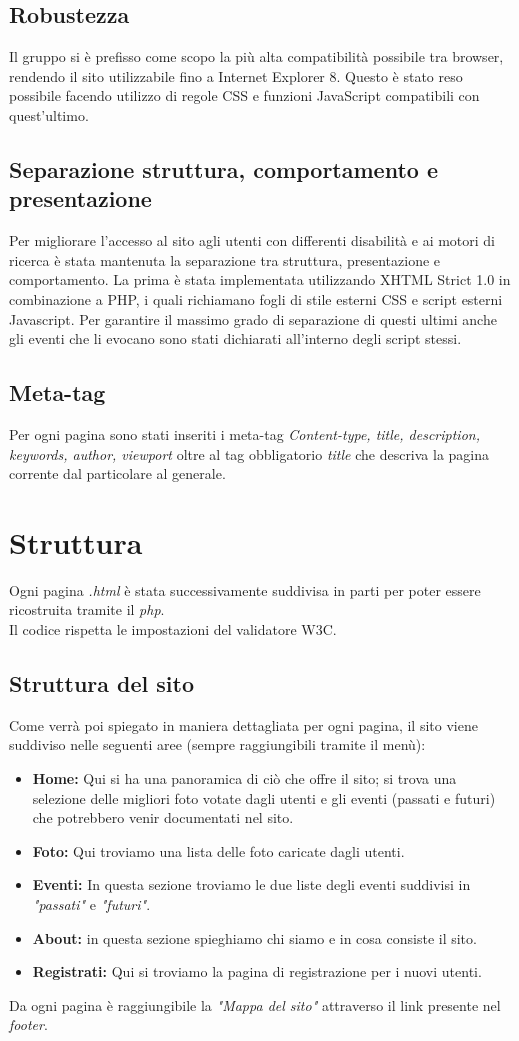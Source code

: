 	\subsection{Robustezza}
	Il gruppo si è prefisso come scopo la più alta compatibilità possibile tra browser, rendendo il sito utilizzabile fino a Internet Explorer 8. Questo è stato reso possibile facendo utilizzo di regole CSS e funzioni JavaScript compatibili con quest'ultimo.
	\subsection{Separazione struttura, comportamento e presentazione}
	Per migliorare l’accesso al sito agli utenti con differenti disabilità e ai motori di
ricerca è stata mantenuta la separazione tra struttura, presentazione e comportamento.
La prima è stata implementata utilizzando XHTML Strict 1.0 in combinazione a PHP, i quali richiamano fogli di stile esterni CSS e script esterni Javascript. Per garantire il massimo grado di separazione di questi ultimi anche gli eventi che li evocano sono stati dichiarati all'interno degli script stessi.
	\subsection{Meta-tag}
	Per ogni pagina sono stati inseriti i meta-tag \textit{Content-type, title, description, keywords, author, viewport} oltre al tag obbligatorio \textit{title} che descriva la pagina corrente dal particolare al generale.
	\section{Struttura}
	Ogni pagina \textit{.html} è stata successivamente suddivisa in parti per poter essere ricostruita tramite il \textit{php}.\\ Il codice rispetta le impostazioni del validatore W3C.
	\subsection{Struttura del sito}
	Come verrà poi spiegato in maniera dettagliata per ogni pagina, il sito viene suddiviso nelle seguenti aree (sempre raggiungibili tramite il menù):
	\begin{itemize}
	\item \textbf{Home:} Qui si ha una panoramica di ciò che offre il sito; si trova una selezione delle migliori foto votate dagli utenti e gli eventi (passati e futuri) che potrebbero venir documentati nel sito.
	\item \textbf{Foto:} Qui troviamo una lista delle foto caricate dagli utenti.
	\item \textbf{Eventi:} In questa sezione troviamo le due liste degli eventi suddivisi in \textit{"passati"} e \textit{"futuri"}.
	\item \textbf{About:} in questa sezione spieghiamo chi siamo e in cosa consiste il sito.
	\item \textbf{Registrati:} Qui si troviamo la pagina di registrazione per i nuovi utenti.
	\end{itemize}
	Da ogni pagina è raggiungibile la \textit{"Mappa del sito"} attraverso il link presente nel \textit{footer}.
